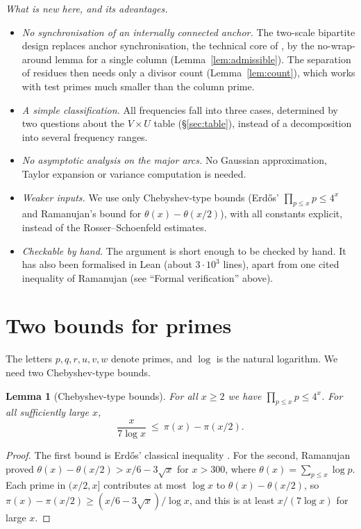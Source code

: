 \documentclass[11pt]{amsart}
\newtheorem{lemma}[theorem]{Lemma}
\theoremstyle{definition}
\theoremstyle{remark}
\begin{document}
\emph{What is new here, and its advantages.}
\begin{itemize}
\item \emph{No synchronisation of an internally connected anchor.} The two-scale bipartite design replaces anchor synchronisation, the technical core of \cite{Tan26}, by the no-wrap-around lemma for a single column (Lemma~\ref{lem:admissible}). The separation of residues then needs only a divisor count (Lemma~\ref{lem:count}), which works with test primes much smaller than the column prime.
\item \emph{A simple classification.} All frequencies fall into three cases, determined by two questions about the $V\times U$ table (\S\ref{sec:table}), instead of a decomposition into several frequency ranges.
\item \emph{No asymptotic analysis on the major arcs.} No Gaussian approximation, Taylor expansion or variance computation is needed.
\item \emph{Weaker inputs.} We use only Chebyshev-type bounds (Erd\H{o}s' $\prod_{p\le x}p\le4^x$ and Ramanujan's bound for $\theta(x)-\theta(x/2)$), with all constants explicit, instead of the Rosser--Schoenfeld estimates.
\item \emph{Checkable by hand.} The argument is short enough to be checked by hand. It has also been formalised in Lean (about $3\cdot10^3$ lines), apart from one cited inequality of Ramanujan (see ``Formal verification'' above).
\end{itemize}


\section{Two bounds for primes}\label{sec:inputs}

The letters $p,q,r,u,v,w$ denote primes, and $\log$ is the natural logarithm. We need two Chebyshev-type bounds.

\begin{lemma}[Chebyshev-type bounds]\label{lem:cheb}
For all $x\ge2$ we have $\prod_{p\le x}p\le 4^x$. For all sufficiently large $x$,
\[
 \frac{x}{7\log x}\ \le\ \pi(x)-\pi(x/2).
\]
\end{lemma}
\begin{proof}
The first bound is Erd\H{o}s' classical inequality \cite{Erd32}. For the second, Ramanujan \cite{Ram19} proved $\theta(x)-\theta(x/2)>x/6-3\sqrt x$ for $x>300$, where $\theta(x)=\sum_{p\le x}\log p$. Each prime in $(x/2,x]$ contributes at most $\log x$ to $\theta(x)-\theta(x/2)$, so $\pi(x)-\pi(x/2)\ge(x/6-3\sqrt x)/\log x$, and this is at least $x/(7\log x)$ for large $x$.
\end{proof}
\end{document}
